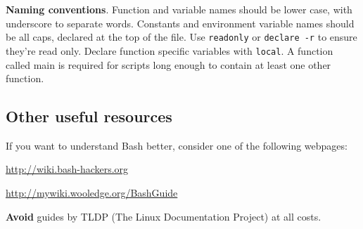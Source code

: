 \textbf{Naming conventions}.
Function and variable names should be lower case, with underscore to separate words.
Constants and environment variable names should be all caps, declared at the top of the file.
Use \texttt{readonly} or \texttt{declare -r} to ensure they're read only.
Declare function specific variables with \texttt{local}.
A function called main is required for scripts long enough to contain at least one other function.

\subsection{Other useful resources}
If you want to understand Bash better, consider one of the following webpages:
\begin{compactenum}
\item \url{http://wiki.bash-hackers.org}
\item \url{http://mywiki.wooledge.org/BashGuide}
\end{compactenum}

\textbf{Avoid} guides by TLDP (The Linux Documentation Project) at all costs.
